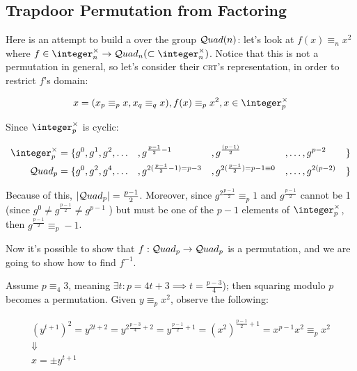 \subsection{Trapdoor Permutation from Factoring}

Here is an attempt to build a \tdp{} over the group $\mathcal{Q}uad(n)$: let's look at $f(x) \equiv_n x^2$ where $f \in \integer_n^\times \to \quadres_n (\subset \integer_n^\times)$. Notice that this is not a permutation in general, so let's consider their \textsc{crt}'s representation\footnotemark, in order to restrict $f$'s domain:


\[
    x = (x_p \equiv_p x, x_q \equiv_q x), f(x) \equiv_p x^2, x \in \integer_p^\times
\]

Since $\integer_p^\times$ is cyclic:

\begin{align*}
    \integer_p^\times   &= \{g^0, g^1, g^2, \ldots  &&, g^{\frac{p - 1}{2} - 1}              &&, g^{\frac{(p-1)}{2}}                    &&, \ldots, g^{p-2}         &&\} \\
    \quadres_p          &= \{g^0, g^2, g^4, \ldots  &&, g^{2(\frac{p - 1}{2} - 1) = p - 3}   &&, g^{2(\frac{p-1}{2}) = p - 1 \equiv 0}  &&, \ldots, g^{2(p - 2)}    &&\} \\
\end{align*}

Because of this, $|\mathcal{Q}uad_p| = \frac{p - 1}{2}$. Moreover, since $g^{2\frac{p-1}{2}} \equiv_p 1$ and $g^{\frac{p-1}{2}}$ cannot be 1 (since $g^0 \neq g^{\frac{p - 1}{2}} \neq g^{p - 1}$ ) but must be one of the $p-1$ elements of $\integer_p^\times$, then $g^{\frac{p-1}{2}} \equiv_p -1$.
    
Now it's possible to show that $f: \mathcal{Q}uad_p \to \mathcal{Q}uad_p$ is a permutation, and we are going to show how to find $f^{-1}$.

Assume $p \equiv_4 3$, meaning $\exists t : p = 4t + 3 \implies t = \frac{p - 3}{4}$); then squaring modulo $p$ becomes a permutation. Given $y \equiv_p x^2$, observe the following:

\begin{gather*}
    (y^{t + 1})^2 = y^{2t + 2} = y^{2\frac{p - 3}{4} + 2} = y^{\frac{p - 1}{2} + 1} = (x^2)^{\frac{p - 1}{2} + 1} = x^{p - 1} x^2 \equiv_p x^2 \\
    \Downarrow \\
    x = \pm y^{t + 1}
\end{gather*}

